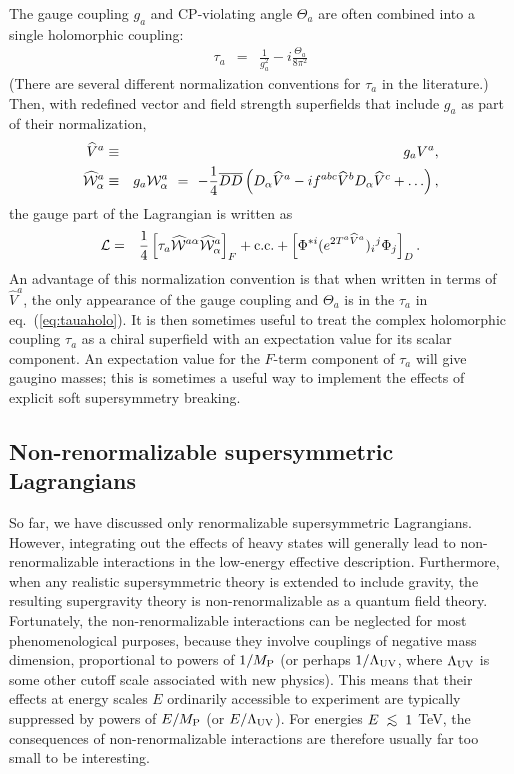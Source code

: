 \documentclass[12pt]{article}
\def\beq{\begin{eqnarray}}
\def\eeq{\end{eqnarray}}
\def\MPlanck{M_{\rm P}}
\def\Dcon{\overline D}
\def\centeron#1#2{{\setbox0=\hbox{#1}\setbox1=\hbox{#2}\ifdim
\wd1>\wd0\kern.5\wd1\kern-.5\wd0\fi
\copy0\kern-.5\wd0\kern-.5\wd1\copy1\ifdim\wd0>\wd1
\kern.5\wd0\kern-.5\wd1\fi}}
\def\ltap{\;\centeron{\raise.35ex\hbox{$<$}}{\lower.65ex\hbox{$\sim$}}\;}
\def\lsim{\mathrel{\ltap}}
\begin{document}
The gauge coupling $g_a$ and CP-violating angle $\Theta_a$ are often 
combined into a single holomorphic
coupling:
\beq
\tau_a &=& \frac{1}{g_a^2} -i \frac{\Theta_a}{8 \pi^2}
\eeq
(There are several different normalization conventions for $\tau_a$ in the literature.)
Then, with redefined
vector and field strength superfields that include $g_a$ as part of their normalization,
\beq
\widehat V^{a} &\equiv& g_a V^{a},
\label{eq:holonorm}
\\
\widehat {\cal W}^{a}_{\alpha} &\equiv& 
g_a {\cal W}^{a}_{\alpha}
\>\,=\>\,
-\frac{1}{4} \Dcon\Dcon \left (
D_\alpha \widehat V^a - i f^{abc} \widehat V^b D_\alpha \widehat V^c + \ldots \right ) 
,
\label{eq:holonormW}
\eeq
the gauge part of the Lagrangian is written as
\beq
{\cal L} &=& 
\frac{1}{4} 
\left [ \tau_a \widehat{\cal W}^{a \alpha}\widehat{\cal W}^{a}_{\alpha} \right ]_F 
+ {\rm c.c.}  + 
\left [
\Phi^{*i} (e^{2 T^a \widehat V^a})_i{}^j \Phi_j \right]_D .
\label{eq:tauaholo}
\eeq
An advantage of this normalization convention is that 
when written in terms of $\widehat V^a$, the only appearance of the gauge coupling
and $\Theta_a$ is in the $\tau_a$ in eq.~(\ref{eq:tauaholo}).
It is then sometimes useful to treat the complex holomorphic coupling $\tau_a$ 
as a 
chiral superfield with an expectation value for its scalar component. 
An expectation value for the 
$F$-term component of $\tau_a$ will give gaugino masses; 
this is sometimes
a useful way to implement the effects of explicit soft supersymmetry breaking.

\subsection{Non-renormalizable 
supersymmetric Lagrangians\label{superspacenonrenorm}}
\setcounter{equation}{0}
\setcounter{footnote}{2}

So far, we have discussed only renormalizable supersymmetric Lagrangians. 
However, integrating out the effects
of heavy states will generally lead to
non-renormalizable interactions in the low-energy 
effective description. Furthermore,  
when any realistic supersymmetric theory is extended to include gravity, 
the resulting supergravity theory is 
non-renormalizable as a quantum field theory. Fortunately, 
the non-renormalizable interactions can be neglected 
for most phenomenological purposes, because they 
involve couplings of negative mass dimension, proportional to 
powers of $1/\MPlanck$ (or perhaps $1/\Lambda_{\rm UV}$, where 
$\Lambda_{\rm UV}$ is some other cutoff scale associated with new 
physics). This means that their effects at energy scales $E$ ordinarily 
accessible to experiment are typically suppressed by powers of 
${E/\MPlanck}$ (or $E/\Lambda_{\rm UV}$). For energies 
$E\lsim 1$ TeV, the consequences of non-renormalizable interactions are 
therefore usually far too small to be interesting.
\end{document}
